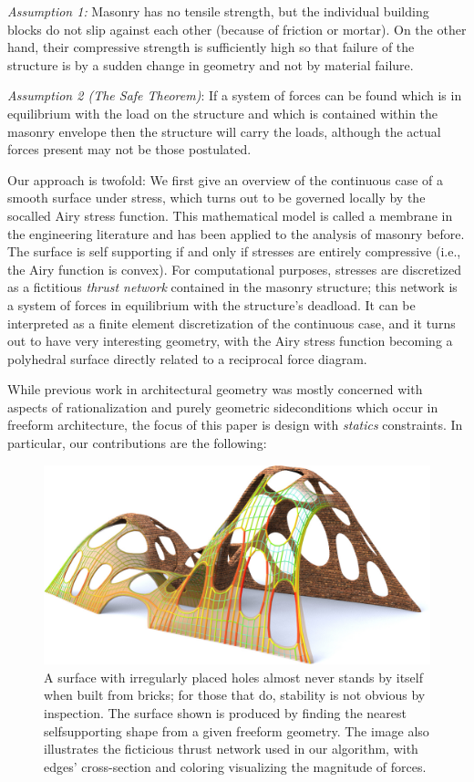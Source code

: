 \documentclass[review]{acmsiggraph}
\begin{document}
{\it Assumption 1:} Masonry has no tensile strength, but the individual 
building blocks do not slip against each other (because of friction or 
mortar). On the other hand, their compressive strength is sufficiently 
high so that failure of the structure is by a sudden change in geometry
and not by material failure.

{\it Assumption 2 (The Safe Theorem)}: If a system of forces can be found 
which is in equilibrium with the load on the structure and which is 
contained within the masonry envelope then the structure will carry the 
loads, although the actual forces present may not be those postulated.

Our approach is twofold: We first give an overview of the continuous case 
of a smooth surface under stress, which turns out to be governed locally by the 
so\dash called Airy stress function. This mathematical 
model is called a membrane in the engineering literature and has been 
applied to the analysis of masonry before. The surface is self\dash 
supporting if and only if stresses are entirely compressive (i.e., the 
Airy function is convex). For computational purposes, stresses are 
discretized as a fictitious {\em thrust network} \cite{Block07} contained 
in the masonry structure; this network is a system of forces in equilibrium with
the structure's deadload. It can be interpreted as a 
finite element discretization of the continuous case, and it turns out to 
have very interesting geometry, with the Airy stress function becoming a
polyhedral surface directly related to a reciprocal force diagram. 

While previous work in architectural geometry was mostly concerned
with aspects of rationalization and purely geometric side\dash conditions
which occur in freeform architecture, the focus of this paper is design with
{\em statics} constraints. In particular, our 
contributions are the following:


	\begin{figure}[t] 
	\includegraphics[width=\columnwidth]{arch-fig/cheesevault78.jpg} 
	\caption{A surface with irregularly placed holes almost 
never stands by itself when built from bricks; for those that do,
stability is not obvious by inspection. The surface shown is produced by 
finding the nearest self\dash supporting shape from a given freeform
geometry. The image also illustrates
the ficticious thrust network used in our algorithm,
with edges' cross-section and coloring visualizing the magnitude of
forces.}
	\label{fig:cheese}
\end{figure}
\end{document}
